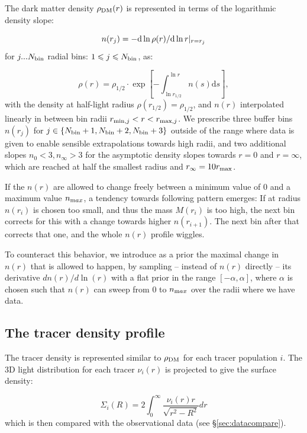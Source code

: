The dark matter density $\rho_{\rm DM}(r)$ is represented in terms of the
logarithmic density slope:

\begin{equation}
n(r_j)=-{\rm d}\ln\rho(r)/{\rm d}\ln
r|_{r=r_j}
\end{equation}
for $j ... N_{\rm bin}$ radial bins: $1\leq j\leq N_{\rm bin}$, as:

\begin{equation*}
    \rho(r) = \rho_{1/2}\cdot\exp\left[-\int_{\ln r_{1/2}}^{\ln r}n(s)\text{d}s\right],
\end{equation*}
with the density at half-light radius $\rho(r_{1/2})=\rho_{1/2}$, and $n(r)$
interpolated linearly in between bin radii $r_{{\rm min},j}<r<r_{{\rm
    max},j}$. We prescribe three buffer bins $n(r_j)$ for $j\in\{N_{\rm bin}+1,
N_{\rm bin}+2, N_{\rm bin}+3\}$ outside of the range where data is given to
enable sensible extrapolations towards high radii, and two additional slopes
$n_0 < 3, n_\infty>3$ for the asymptotic density slopes towards $r=0$ and
$r=\infty$, which are reached at half the smallest radius and $r_\infty=10r_{\rm
  max}$.

If the $n(r)$ are allowed to change freely between a minimum
value of $0$ and a maximum value $n_{\text max}$, a tendency towards following
pattern emerges: If at radius $n(r_i)$ is chosen too small, and thus the mass
$M(r_i)$ is too high, the next bin corrects for this with a change towards
higher $n(r_{i+1})$. The next bin after that corrects that one, and the whole
$n(r)$ profile wiggles.

To counteract this behavior, we introduce as a prior the maximal change in
$n(r)$ that is allowed to happen, by sampling -- instead of $n(r)$ directly --
its derivative $dn(r)/d\ln(r)$ with a flat prior in the range $[-\alpha,
\alpha]$, where $\alpha$ is chosen such that $n(r)$ can sweep from $0$ to
$n_{\text max}$ over the radii where we have data.

\subsection{The tracer density profile}
The tracer density is represented similar to $\rho_{\rm DM}$ for each tracer
population $i$. The 3D light distribution for each tracer $\nu_i(r)$ is
projected to give the surface density:

\begin{equation}
\Sigma_i(R) = 2\int_0^\infty \frac{\nu_i(r) r}{\sqrt{r^2 - R^2}}dr
\end{equation}
which is then compared with the observational data (see
\S\ref{sec:datacompare}).

